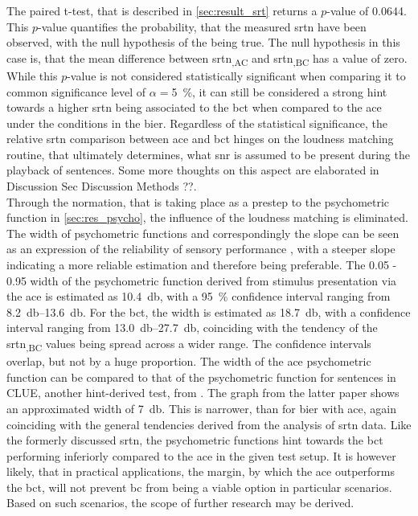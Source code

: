 The paired t-test, that is described in \autoref{sec:result_srt} returns a $p$-value of 0.0644. This $p$-value quantifies the probability, that the measured \gls{srtn} have been observed, with the null hypothesis of the being true. The null hypothesis in this case is, that the mean difference between \gls{srtn}\textsubscript{,AC} and \gls{srtn}\textsubscript{,BC} has a value of zero. 
While this $p$-value is not considered statistically significant when comparing it to common significance level of $\alpha=$\SI{5}{\percent}, it can still be considered a strong hint towards a higher \gls{srtn}  being associated to the \gls{bct} when compared to the \gls{ace} under the conditions in the \gls{bier}.
Regardless of the statistical significance, the relative \gls{srtn} comparison between \gls{ace} and \gls{bct} hinges on the loudness matching routine, that ultimately determines, what \gls{snr} is assumed to be present during the playback of sentences.
Some more thoughts on this aspect are elaborated in Discussion Sec Discussion Methods ??.\\
Through the normation, that is taking place as a prestep to the psychometric function in \autoref{sec:res_psycho}, the influence of the loudness matching is eliminated.
The width of psychometric functions and correspondingly the slope can be seen as an expression of the reliability of sensory performance \citep{strasburger_01}, with a steeper slope indicating a more reliable estimation and therefore being preferable.
The 0.05 - 0.95 width of the psychometric function derived from stimulus presentation via the \gls{ace} is estimated as \SI{10.4}{\decibel}, with a \SI{95}{\percent} confidence interval ranging from \SIrange{8.2}{13.6}{\decibel}. For the \gls{bct}, the width is estimated as \SI{18.7}{\decibel}, with a confidence interval ranging from \SIrange{13.0}{27.7}{\decibel}, coinciding with the tendency of the \gls{srtn}\textsubscript{,BC} values being spread across a wider range. The confidence intervals overlap, but not by a huge proportion. 
The width of the \gls{ace} psychometric function can be compared to that of the psychometric function for sentences in CLUE, another \gls{hint}-derived test, from \citep{nielsen_dau_09}. The graph from the latter paper shows an approximated width of \SI{7}{\decibel}. This is narrower, than for \gls{bier} with \gls{ace}, again coinciding with the general tendencies derived from the analysis of \gls{srtn} data.
Like the formerly discussed \gls{srtn}, the psychometric functions hint towards the \gls{bct} performing inferiorly compared to the \gls{ace} in the given test setup.
It is however likely, that in practical applications, the margin, by which the \gls{ace} outperforms the \gls{bct}, will not prevent \gls{bc} from being a viable option in particular scenarios.
Based on such scenarios, the scope of further research may be derived. 
 


